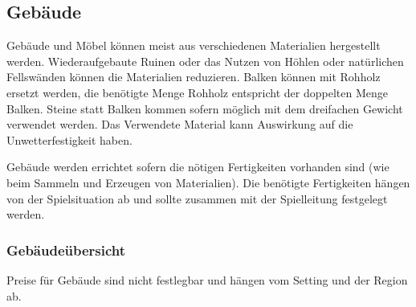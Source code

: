 \documentclass{article}
\begin{document}
\begin{center}
\subsection{Gebäude}
\end{center}

Gebäude und Möbel können meist aus verschiedenen Materialien hergestellt werden. Wiederaufgebaute Ruinen oder das
Nutzen von Höhlen oder natürlichen Fellswänden können die Materialien reduzieren. Balken können mit Rohholz ersetzt
werden, die benötigte Menge Rohholz entspricht der doppelten Menge Balken. Steine statt Balken kommen sofern möglich
mit dem dreifachen Gewicht verwendet werden. Das Verwendete Material kann Auswirkung auf die Unwetterfestigkeit
haben.

Gebäude werden errichtet sofern die nötigen Fertigkeiten vorhanden sind (wie beim Sammeln und Erzeugen von Materialien).
Die benötigte Fertigkeiten hängen von der Spielsituation ab und sollte zusammen mit der Spielleitung festgelegt
werden.

\subsubsection{Gebäudeübersicht}

Preise für Gebäude sind nicht festlegbar und hängen vom Setting und der Region ab.
\end{document}
